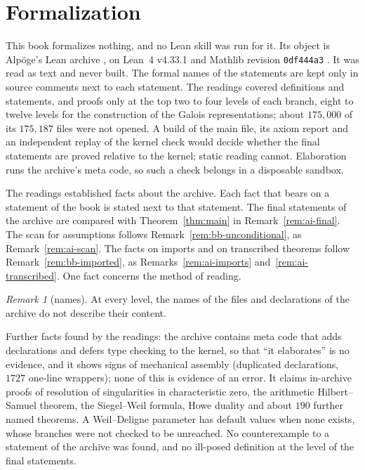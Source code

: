 \documentclass[11pt]{amsbook}
\theoremstyle{plain}
\theoremstyle{definition}
\theoremstyle{remark}
\newtheorem{remark}[theorem]{Remark}
\numberwithin{equation}{section}
\numberwithin{figure}{chapter}
\numberwithin{table}{chapter}
\newcommand{\vtwomathlib}{https://github.com/leanprover-community/%
mathlib4/commit/0df444a360eaa60ab8c11dca51a86af692955474}
\begin{document}
\section{Formalization}
\label{sec:ai-formalization}
This book formalizes nothing, and no Lean skill was run for it. Its
object is Alp\"oge's Lean archive \cite{AlpogeArchive2026}, on Lean~4
v4.33.1
\cite[\href{https://github.com/leanprover/lean4/releases/tag/v4.33.1}%
{release v4.33.1}]{Lean4}
\cite[\href{https://doi.org/10.1007/978-3-030-79876-5_37}{DOI}]%
{Moura2021} and Mathlib revision \texttt{0df444a3}
\cite[\href{\vtwomathlib}{commit}]{Mathlib}. It was read as text and
never built. The formal names of the statements are kept only in
source comments next to each statement. The readings covered
definitions and statements, and proofs only at the top two to four
levels of each branch, eight to twelve levels for the construction of
the Galois representations; about $175{,}000$ of its $175{,}187$ files
were not opened. A build of the main file, its axiom report and an
independent replay of the kernel check
\cite[\href{https://github.com/leanprover/lean4checker}%
{repository}]{lean4checker} would decide whether the final statements
are proved relative to the kernel; static reading cannot. Elaboration
runs the archive's meta code, so such a check belongs in a disposable
sandbox.

The readings established facts about the archive. Each fact that
bears on a statement of the book is stated next to that statement.
The final statements of the archive are compared with
Theorem~\ref{thm:main} in Remark~\ref{rem:ai-final}. The scan for
assumptions follows Remark~\ref{rem:bb-unconditional}, as
Remark~\ref{rem:ai-scan}. The facts on imports and on transcribed
theorems follow Remark~\ref{rem:bb-imported}, as
Remarks~\ref{rem:ai-imports} and~\ref{rem:ai-transcribed}. One fact
concerns the method of reading.

\begin{remark}[names]\label{rem:ai-names}
At every level, the names of the files and declarations of the archive
do not describe their content.
\end{remark}

Further facts found by the readings: the archive contains meta code
that adds declarations and defers type checking to the kernel, so that
``it elaborates'' is no evidence, and it shows signs of mechanical
assembly (duplicated declarations, $1727$ one-line wrappers); none of
this is evidence of an error. It claims in-archive proofs of
resolution of singularities in characteristic zero, the arithmetic
Hilbert--Samuel theorem, the Siegel--Weil formula, Howe duality and
about $190$ further named theorems. A Weil--Deligne parameter has
default values when none exists, whose branches were not checked to be
unreached. No counterexample to a statement of the archive was found,
and no ill-posed definition at the level of the final statements.
\end{document}

